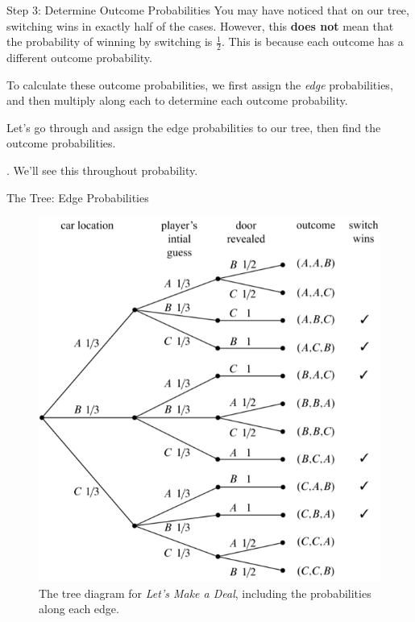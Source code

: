 \documentclass{beamer}
\begin{document}
\begin{frame}{Step 3: Determine Outcome Probabilities}
You may have noticed that on our tree, switching wins in exactly half of the cases. However, this \textbf{does not} mean that the probability of winning by switching is $\frac{1}{2}$. This is because each outcome has a different \alert{outcome probability}.\vspace{2mm}

To calculate these outcome probabilities, we first assign the \textit{edge} probabilities, and then multiply along each to determine each outcome probability. \vspace{2mm}

Let's go through and assign the edge probabilities to our tree, then find the outcome probabilities. \vspace{2mm}

. We'll see this throughout probability.
\end{frame}

\begin{frame}{The Tree: Edge Probabilities}
    \begin{figure}
        \centering
        \includegraphics[scale=.5]{montyhalledgeprobs.png}
        \caption{The tree diagram for \textit{Let's Make a Deal}, including the probabilities along each edge.}
        \label{fig:montyhalledge}
    \end{figure}
\end{frame}
\end{document}
